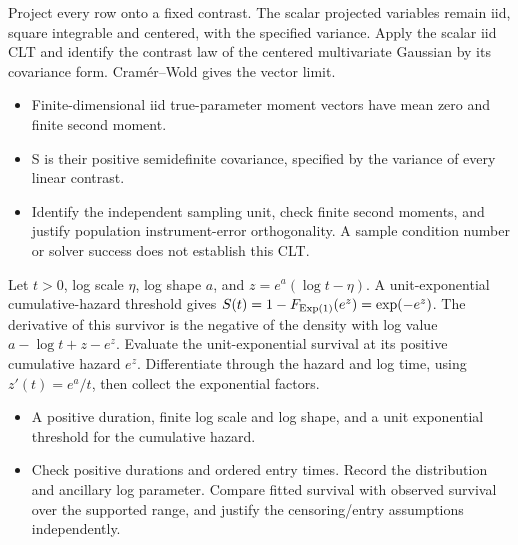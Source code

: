 \expandafter\def\csname statadic@proof@STATADIC-GMM-011\endcsname{Project every row onto a fixed contrast. The scalar projected
  variables remain iid, square integrable and centered, with the specified
  variance. Apply the scalar iid CLT and identify the contrast law of the
  centered multivariate Gaussian by its covariance form. Cramér–Wold gives
  the vector limit.}
\expandafter\def\csname statadic@assumptions@STATADIC-GMM-011\endcsname{\begin{itemize}
\item Finite-dimensional iid true-parameter moment vectors have mean zero and finite second moment.
\item S is their positive semidefinite covariance, specified by the variance of every linear contrast.
\end{itemize}}
\expandafter\def\csname statadic@diagnostics@STATADIC-GMM-011\endcsname{\begin{itemize}
\item Identify the independent sampling unit, check finite second moments, and justify population instrument-error orthogonality. A sample condition number or solver success does not establish this CLT.
\end{itemize}}
\expandafter\def\csname statadic@statement@STATADIC-SURVIVAL-004\endcsname{Let $t>0$, log scale $\eta$, log shape $a$, and
  $z=e^a(\log t-\eta)$. A unit-exponential cumulative-hazard threshold
  gives $S(t)=1-F_{\rm Exp(1)}(e^z)=\exp(-e^z)$.
  The derivative of this survivor is the negative of the density with
  log value $a-\log t+z-e^z$.}
\expandafter\def\csname statadic@proof@STATADIC-SURVIVAL-004\endcsname{Evaluate the unit-exponential survival at its positive
  cumulative hazard $e^z$. Differentiate through the hazard and log time,
  using $z'(t)=e^a/t$, then collect the exponential factors.}
\expandafter\def\csname statadic@assumptions@STATADIC-SURVIVAL-004\endcsname{\begin{itemize}
\item A positive duration, finite log scale and log shape, and a unit exponential threshold for the cumulative hazard.
\end{itemize}}
\expandafter\def\csname statadic@diagnostics@STATADIC-SURVIVAL-004\endcsname{\begin{itemize}
\item Check positive durations and ordered entry times. Record the distribution and ancillary log parameter. Compare fitted survival with observed survival over the supported range, and justify the censoring/entry assumptions independently.
\end{itemize}}
